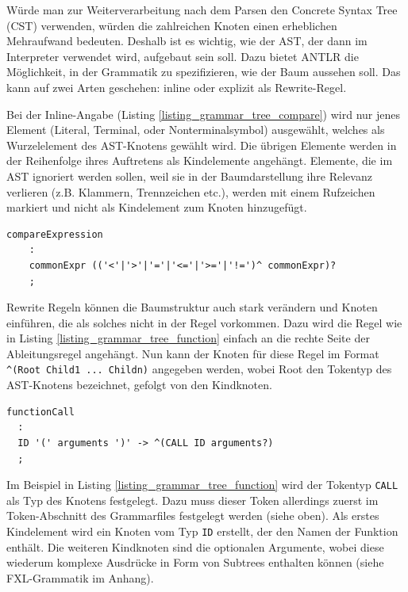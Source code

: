 Würde man zur Weiterverarbeitung nach dem Parsen den Concrete Syntax Tree (CST) verwenden, würden die zahlreichen Knoten einen erheblichen Mehraufwand bedeuten. Deshalb ist es wichtig, wie der AST, der dann im Interpreter verwendet wird, aufgebaut sein soll. Dazu bietet ANTLR die Möglichkeit, in der Grammatik zu spezifizieren, wie der Baum aussehen soll. Das kann auf zwei Arten geschehen: inline oder explizit als Rewrite-Regel.

Bei der Inline-Angabe (Listing \ref{listing_grammar_tree_compare}) wird nur jenes Element (Literal, Terminal, oder Nonterminalsymbol) ausgewählt, welches als Wurzelelement des AST-Knotens gewählt wird. Die übrigen Elemente werden in der Reihenfolge ihres Auftretens als Kindelemente an\-ge\-hängt. Elemente, die im AST ignoriert werden sollen, weil sie in der Baumdarstellung ihre Relevanz verlieren (z.B. Klammern, Trennzeichen etc.), werden mit einem Rufzeichen markiert und nicht als Kindelement zum Knoten hinzugefügt.


\begin{lstlisting}[float = htbp,caption={Inline-Regeln zur Beschreibung der Baumstruktur.},label=listing_grammar_tree_compare]
compareExpression
  	:
  	commonExpr (('<'|'>'|'='|'<='|'>='|'!=')^ commonExpr)?
  	;

\end{lstlisting}

Rewrite Regeln können die Baumstruktur auch stark verändern und Knoten einführen, die als solches nicht in der Regel vorkommen. Dazu wird die Regel wie in Listing \ref{listing_grammar_tree_function} einfach an die rechte Seite der Ab\-lei\-tungs\-re\-gel an\-ge\-hängt. Nun kann der Knoten für diese Regel im Format \texttt{\textasciicircum(Root Child1 ... Childn)} angegeben werden, wobei Root den Tokentyp des AST-Knotens bezeichnet, gefolgt von den Kindknoten. 


\begin{lstlisting}[float = htbp,caption={Rewrite-Regeln zur Beschreibung der Baumstruktur.},label=listing_grammar_tree_function]
functionCall
  :
  ID '(' arguments ')' -> ^(CALL ID arguments?)
  ;
\end{lstlisting}

Im Beispiel in Listing \ref{listing_grammar_tree_function} wird der Tokentyp \texttt{CALL} als Typ des Knotens festgelegt. Dazu muss dieser Token allerdings zuerst im Token-Abschnitt des Grammarfiles festgelegt werden (siehe oben). Als erstes Kindelement wird ein Knoten vom Typ \texttt{ID} erstellt, der den Namen der Funktion enthält. Die weiteren Kindknoten sind die optionalen Argumente, wobei diese wiederum komplexe Ausdrücke in Form von Subtrees enthalten können (siehe FXL-Grammatik im Anhang).

